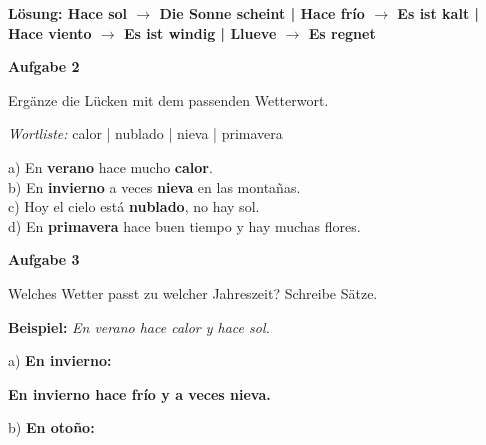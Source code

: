 \documentclass[11pt, a4paper]{article}
\newcommand{\fachfarbe}{spanisch}
\newcommand{\punktebox}[1]{\hfill\fbox{\small \_/#1}}
\newcommand{\loesung}[1]{\textcolor{loesung}{\textbf{#1}}}
\newenvironment{aufgabe}[1]{%
    \needspace{5\baselineskip}%
    \nopagebreak[4]%
    \vspace{10pt}
    \noindent\textbf{\textcolor{\fachfarbe}{Aufgabe #1}}
    \nopagebreak[4]%
    \vspace{5pt}
    \nopagebreak[4]%
    \begin{list}{}{\leftmargin=0pt}
    \item[]
}{%
    \end{list}
}
\newcommand{\es}[1]{\textcolor{\fachfarbe}{\textbf{#1}}}
\begin{document}
\loesung{Lösung: Hace sol $\rightarrow$ Die Sonne scheint | Hace frío $\rightarrow$ Es ist kalt | Hace viento $\rightarrow$ Es ist windig | Llueve $\rightarrow$ Es regnet}

\vspace{15pt}


\begin{aufgabe}{2}
Ergänze die Lücken mit dem passenden Wetterwort. \punktebox{4}
\end{aufgabe}

\begin{vokabelkasten}
\textit{Wortliste:} calor | nublado | nieva | primavera
\end{vokabelkasten}

\vspace{0.5em}

\noindent
a) En \es{verano} hace mucho \loesung{calor}. \\[0.8em]
b) En \es{invierno} a veces \loesung{nieva} en las montañas. \\[0.8em]
c) Hoy el cielo está \loesung{nublado}, no hay sol. \\[0.8em]
d) En \loesung{primavera} hace buen tiempo y hay muchas flores. \\

\vspace{15pt}


\begin{aufgabe}{3}
Welches Wetter passt zu welcher Jahreszeit? Schreibe Sätze. \punktebox{4}
\end{aufgabe}

\noindent
\textbf{Beispiel:} \textit{En verano hace calor y hace sol.}

\vspace{0.5em}

\noindent
a) \textbf{En invierno:}

\loesung{En invierno hace frío y a veces nieva.}

\vspace{0.8em}

b) \textbf{En otoño:}
\end{document}
